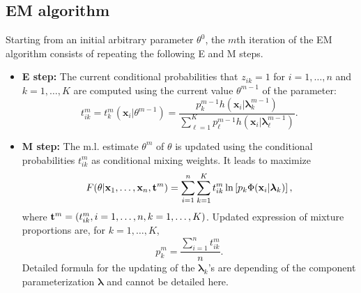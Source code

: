 \documentclass[12pt]{article}
\newcommand{\bx}{\mathbf{x}}
\newcommand{\blambda}{\boldsymbol{\lambda}}
\begin{document}
\subsection{EM algorithm}
Starting from an initial arbitrary parameter $\theta^0$, the $m$th iteration of the EM
algorithm consists of repeating the following E and M steps.
\begin{itemize}
\item {\bf E step:} The current conditional probabilities that $z_{ik}=1$ for $i=1,\ldots,n$
  and $k=1,\ldots,K$ are computed using the current value $\theta^{m-1}$ of the parameter:
  \begin{equation}
    \label{eq:condi}
    t^m_{ik}=t^m_k(\bx_i|\theta^{m-1})=\frac{ p^{m-1}_kh (\bx_i|{\blambda^{m-1}_k})}
    {\sum_{\ell=1}^K  p^{m-1}_\ell h(\bx_i|\blambda^{m-1}_\ell)}.
  \end{equation}
\item {\bf M step:} The m.l. estimate $\theta^m$ of $\theta$ is updated using the conditional
  probabilities $t^m_{ik}$ as conditional mixing weights. It leads to maximize
  \begin{equation} \label{eq:proportionEM}
    F(\theta| {\bf x}_{1},\ldots,{\bf x}_{n}, {\bf
      t}^m)=\sum_{i=1}^{n}\sum_{k=1}^{K} t_{ik}^m \ln \left [p_{k} \Phi({\bf
        x}_{i}|\blambda_{k})\right ],
  \end{equation}
  where ${\bf t}^m=(t_{ik}^m, i=1,\ldots,n, k=1,\ldots,K)$. Updated expression of mixture
  proportions are, for $k=1,\ldots,K$,
  \begin{equation}
    p_k^m=\frac{\sum_{i=1}^n t^m_{ik}}{n}.
  \end{equation}
  Detailed formula for the updating of the $\blambda_k$'s are depending of the component
  parameterization $\blambda$ and cannot be detailed here.
\end{itemize}

\end{document}
